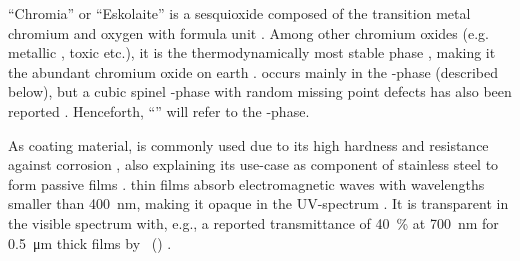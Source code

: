 
\enquote{Chromia} or \enquote{Eskolaite} is a sesquioxide composed of the transition metal chro\-mi\-um and oxygen with formula unit .
Among other chromium oxides (e.g. metallic , toxic  etc.), it is the thermodynamically most stable phase 
    \cite{robbert1998,al-kuhaili2007,lebreau2014},
making it the abundant chromium oxide on earth
    \cite{mi2018}.
 occurs mainly in the \textalpha-phase (described below), but a cubic spinel \textgamma-phase with random missing  point defects has also been reported
    \cite{robbert1998}.
Henceforth, \enquote{} will refer to the \textalpha-phase.

As coating material,  is commonly used due to its high hardness and resistance against corrosion \cite{singh2019,al-kuhaili2007}, also explaining its use-case as component of stainless steel to form passive films \cite{lebreau2014}.
 thin films absorb electromagnetic waves with wavelengths smaller than \qty{400}{\nm}, making it opaque in the \acrshort{UV}-spectrum \cite{cheng1996,guillen2021}.
It is transparent in the visible spectrum with, e.g., a reported transmittance of \qty{40}{\percent} at \qty{700}{\nm} for \qty{0.5}{\um} thick films by \citeauthor{cheng1996}~(\citeyear{cheng1996}) \cite{cheng1996}.


